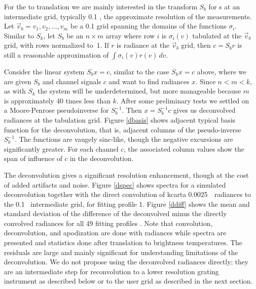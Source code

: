 \documentclass[11pt]{article}
\begin{document}
For the {\airs} to {\cris} translation we are mainly interested in 
the transform $S_b$ for {\srf}s at an intermediate grid, typically
0.1 {\wn}, the approximate resolution of the {\srf} measurements.
Let $\vec v_b = v_1,v_2,\ldots,v_m$ be a 0.1 {\wn} grid spanning the
domains of the functions $\sigma_i$.  Similar to $S_k$, let $S_b$ be
an $n\times m$ array where row $i$ is $\sigma_i(v)$ tabulated at the
$\vec v_b$ grid, with rows normalized to~1.  If $r$ is radiance at
the $\vec v_b$ grid, then $c = S_b r$ is still a reasonable
approximation of $\int\sigma_i(v)r(v)\,dv$.

Consider the linear system $S_b x = c$, similar to the case $S_k x =
c$ above, where we are given $S_b$ and channel signals $c$ and want
to find radiances $x$.  Since $n < m < k$, as with $S_k$ the system
will be underdetermined, but more manageable because $m$ is
approximately 40 times less than $k$.  After some preliminary tests
we settled on a Moore-Penrose pseudoinverse for $S_b^{-1}$.  Then $x
= S_b^{-1} c$ gives us deconvolved radiances at the {\srf} tabulation
grid.  Figure \ref{dbasis} shows adjacent typical basis function for
the deconvolution, that is, adjacent columns of the pseudo-inverse
$S_b^{-1}$.  The functions are vaugely sinc-like, though the negative
excursions are significantly greater.  For each channel $c$, the
associated column values show the span of influence of $c$ in the
deconvolution.

The {\airs} deconvolution gives a significant resolution enhancement,
though at the cost of added artifacts and noise.  Figure \ref{dspec}
shows spectra for a simulated deconvolution together with the direct
convolution of kcarta 0.0025~\wn\ radiances to the 0.1~{\wn}
intermediate grid, for fitting profile 1.  Figure \ref{ddiff} shows
the mean and standard deviation of the difference of the deconvolved
minus the directly convolved radiances for all 49 fitting profiles
\cite{sarta1,sarta2}.  Note that convolution, deconvolution, and
apodization are done with radiances while spectra are presented and
statistics done after translation to brightness temperatures.
The residuals are large and mainly significant for understanding
limitations of the deconvolution.  We do not propose using the
deconvolved radiances directly; they are an intermediate step for
reconvolution to a lower resolution grating instrument as described
below or to the {\cris} user grid as described in the next section.
\end{document}

